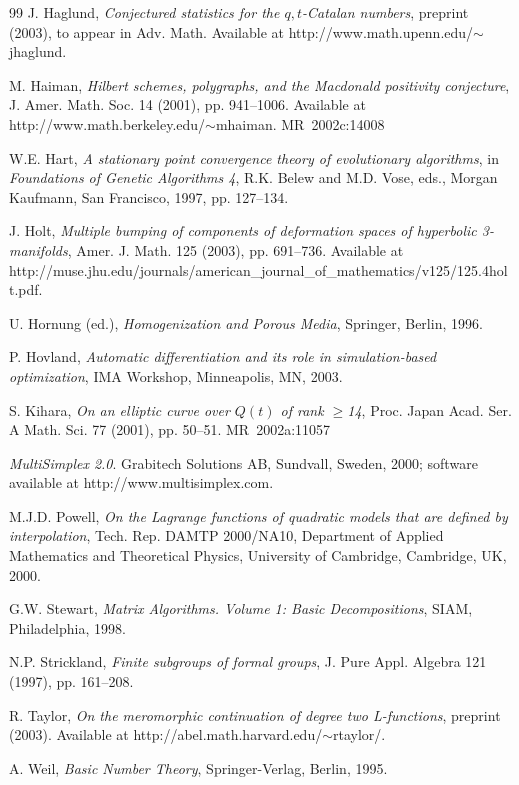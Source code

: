 \documentclass[]{interact}
\theoremstyle{plain}%
\theoremstyle{definition}
\theoremstyle{remark}
\begin{document}
\begin{thebibliography}{99}
J. Haglund, \emph{Conjectured statistics for the {$q,t$}-Catalan numbers},
  preprint (2003), to appear in Adv. Math. Available at
  http://www.math.upenn.edu/$\sim$jhaglund.

M. Haiman, \emph{Hilbert schemes, polygraphs, and the Macdonald positivity
  conjecture}, J. Amer. Math. Soc. 14 (2001), pp. 941--1006. Available at
  http://www.math.berkeley.edu/$\sim$mhaiman. MR~2002c:14008

W.E. Hart, \emph{A stationary point convergence theory of evolutionary
  algorithms}, in \emph{Foundations of Genetic Algorithms 4}, R.K. Belew and
  M.D. Vose, eds., Morgan Kaufmann, San Francisco, 1997, pp. 127--134.

J. Holt, \emph{Multiple bumping of components of deformation spaces of
  hyperbolic 3-manifolds}, Amer. J. Math. 125 (2003), pp. 691--736. Available at
  http://muse.jhu.edu/journals/american\_journal\_of\_mathematics/v125/125.4holt.pdf.

U. Hornung (ed.), \emph{Homogenization and Porous Media}, Springer, Berlin,
  1996.

P. Hovland, \emph{Automatic differentiation and its role in simulation-based
  optimization}, IMA Workshop, Minneapolis, MN, 2003.

S. Kihara, \emph{On an elliptic curve over {$Q(t)$} of rank $\geq$14}, Proc.
  Japan Acad. Ser. A Math. Sci. 77 (2001), pp. 50--51. MR~2002a:11057

\emph{MultiSimplex 2.0}. Grabitech Solutions AB, Sundvall, Sweden, 2000;
  software available at http://www.multisimplex.com.

M.J.D. Powell, \emph{On the Lagrange functions of quadratic models that are
  defined by interpolation}, Tech. Rep. DAMTP 2000/NA10, Department of
  Applied Mathematics and Theoretical Physics, University of Cambridge,
  Cambridge, UK, 2000.

G.W. Stewart, \emph{Matrix Algorithms. Volume 1: Basic Decompositions}, SIAM,
  Philadelphia, 1998.

N.P. Strickland, \emph{Finite subgroups of formal groups}, J. Pure Appl.
  Algebra 121 (1997), pp. 161--208.

R. Taylor, \emph{On the meromorphic continuation of degree two L-functions},
  preprint (2003). Available at http://abel.math.harvard.edu/$\sim$rtaylor/.

A. Weil, \emph{Basic Number Theory}, Springer-Verlag, Berlin, 1995.

\end{thebibliography}
\end{document}
